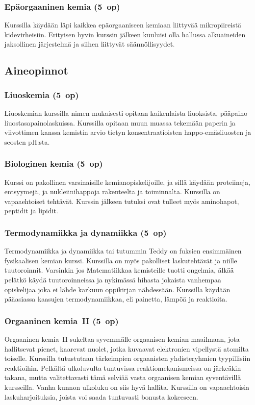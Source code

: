 \documentclass[../ala_hataile.tex]{subfiles}
\begin{document}
	\subsubsection*{Epäorgaaninen kemia (5~op)}
Kurssilla käydään läpi kaikkea epä\-orgaaniseen
	kemiaan liittyvää mikro\-piireistä
	kide\-virheisiin. Erityisen hyvin kurssin jälkeen
	kuuluisi olla hallussa alkuaineiden
	jaksollinen järjestelmä ja siihen liittyvät
	säännöllisyydet.
	
	\subsection*{Aineopinnot}
	\subsubsection*{Liuoskemia (5~op)}
	Liuoskemian kurssilla nimen mukaisesti
	opitaan kaikenlaista liuoksista, pääpaino liuos\-tasa\-paino\-laskuissa. Kurssilla opitaan
	muun muassa tekemään paperin ja viivottimen
	kanssa kemistin arvio tietyn konsentraatioisten
	happo-emäsliuosten ja seosten pH:sta.
	
	\subsubsection*{Biologinen kemia (5~op)}
	Kurssi on pakollinen varsinaisille kemian\-opiskelijoille,
	ja sillä käydään proteiineja, entsyymejä,
	ja nukleiini\-happoja rakenteelta
	ja toiminnalta. Kurssilla on vapaaehtoiset
	tehtävät. Kurssin jälkeen tutuksi ovat tulleet
	myös aminohapot, peptidit ja lipidit.
	
	\subsubsection*{Termodynamiikka ja dynamiikka (5~op)}
Termodynamiikka
	ja dynamiikka tai tutummin
	Teddy on fuksien ensimmäinen fysikaalisen
	kemian kurssi. Kurssilla on myös pakolliset
	laskutehtävät ja niille tuutoroinnit.
	Varsinkin jos Matematiikkaa kemisteille
	tuotti ongelmia, älkää pelätkö käydä tuutoroinneissa
	ja nykimässä hihasta jokaista
	vanhempaa opiskelijaa joka ei lähde karkuun
	oppikirjan nähdessään. Kurssilla käydään
	pääasiassa kaasujen termodynamiikkaa,
	eli painetta, lämpöä ja reaktioita.
	
	\subsubsection*{Orgaaninen kemia~II (5~op)}
	Orgaaninen kemia~II sukeltaa syvemmälle
	orgaanisen kemian maailmaan, jota
	hallitsevat pienet, kaarevat nuolet, jotka
	kuvaavat elektronien vipellystä atomilta
	toiselle. Kurssilla tutustutaan tärkeimpien
	orgaanisten yhdisteryhmien tyypillisiin reaktioihin.
	Pelkältä ulkoluvulta tuntuvissa
	reaktiomekanismeissa on järkeäkin takana,
	mutta valitettavasti tämä selviää vasta
	orgaanisen kemian syventävillä kursseilla.
	Vanha kunnon ulkoluku on siis hyvä hallita.
	Kurssilla on vapaaehtoisia laskuharjoituksia,
	joista voi saada tuntuvasti bonusta
	kokeeseen.
\end{document}
